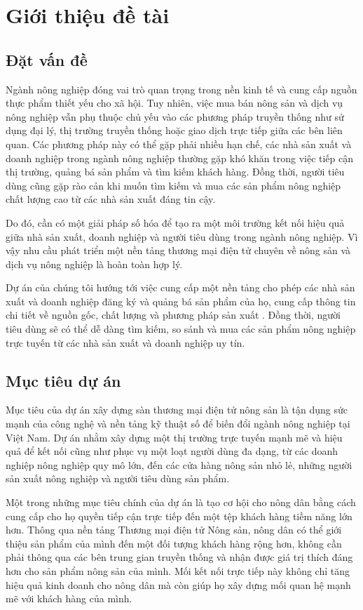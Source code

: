 \chapter{Giới thiệu đề tài}
\section{Đặt vấn đề}
\quad Ngành nông nghiệp đóng vai trò quan trọng trong nền kinh tế và cung cấp nguồn thực phẩm thiết yếu cho xã hội. Tuy nhiên, việc mua bán nông sản và dịch vụ nông nghiệp vẫn phụ thuộc chủ yếu vào các phương pháp truyền thống như sử dụng đại lý, thị trường truyền thống hoặc giao dịch trực tiếp giữa các bên liên quan. Các phương pháp này có thể gặp phải nhiều hạn chế, các nhà sản xuất và doanh nghiệp trong ngành nông nghiệp thường gặp khó khăn trong việc tiếp cận thị trường, quảng bá sản phẩm và tìm kiếm khách hàng. Đồng thời, người tiêu dùng cũng gặp rào cản khi muốn tìm kiếm và mua các sản phẩm nông nghiệp chất lượng cao từ các nhà sản xuất đáng tin cậy.

Do đó, cần có một giải pháp số hóa để tạo ra một môi trường kết nối hiệu quả giữa nhà sản xuất, doanh nghiệp và người tiêu dùng trong ngành nông nghiệp. Vì vậy nhu cầu phát triển một nền tảng thương mại điện tử chuyên về nông sản và dịch vụ nông nghiệp là hoàn toàn hợp lý. 

Dự án của chúng tôi hướng tới việc cung cấp một nền tảng cho phép các nhà sản xuất và doanh nghiệp đăng ký và quảng bá sản phẩm của họ, cung cấp thông tin chi tiết về nguồn gốc, chất lượng và phương pháp sản xuất . Đồng thời, người tiêu dùng sẽ có thể dễ dàng tìm kiếm, so sánh và mua các sản phẩm nông nghiệp trực tuyến từ các nhà sản xuất và doanh nghiệp uy tín.

\section{Mục tiêu dự án}
\quad Mục tiêu của dự án xây dựng sàn thương mại điện tử nông sản là tận dụng sức mạnh của công nghệ và nền tảng kỹ thuật số để biến đổi ngành nông nghiệp tại Việt Nam. Dự án nhằm xây dựng một thị trường trực tuyến mạnh mẽ và hiệu quả để kết nối cũng như phục vụ một loạt người dùng đa dạng, từ các doanh nghiệp nông nghiệp quy mô lớn, đến các cửa hàng nông sản nhỏ lẻ, những người sản xuất nông nghiệp và người tiêu dùng sản phẩm.

Một trong những mục tiêu chính của dự án là tạo cơ hội cho nông dân bằng cách cung cấp cho họ quyền tiếp cận trực tiếp đến một tệp khách hàng tiềm năng lớn hơn. Thông qua nền tảng Thương mại điện tử Nông sản, nông dân có thể giới thiệu sản phẩm của mình đến một đối tượng khách hàng rộng hơn, không cần phải thông qua các bên trung gian truyền thống và nhận được giá trị thích đáng hơn cho sản phẩm nông sản của mình. Mối kết nối trực tiếp này không chỉ tăng hiệu quả kinh doanh cho nông dân mà còn giúp họ xây dựng mối quan hệ mạnh mẽ với khách hàng của mình.

